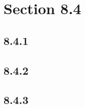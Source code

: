





\section*{Section 8.4}

\subsection*{8.4.1}
\begin{enumerate}
\end{enumerate}

\subsection*{8.4.2}
\begin{enumerate}
\end{enumerate}

\subsection*{8.4.3}
\begin{enumerate}
\end{enumerate}

